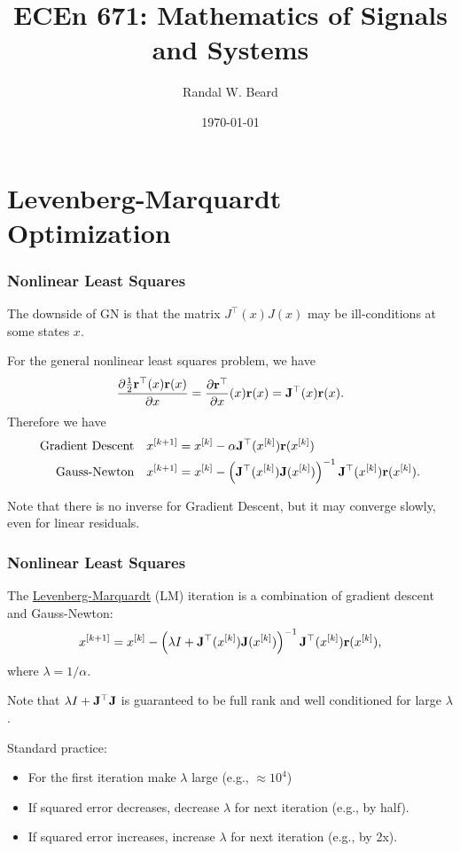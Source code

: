 \documentclass{beamer}
\title{ECEn 671: Mathematics of Signals and Systems}
\author{Randal W. Beard}
\institute{Brigham Young University}
\date{\today}
\begin{document}
\begin{frame}
	\titlepage
\end{frame}

\section{Levenberg-Marquardt Optimization}
\frame{\sectionpage}

\begin{frame}\frametitle{Nonlinear Least Squares}
	The downside of GN is that the matrix $J^\top(x) J(x)$ may be ill-conditions at some states $x$.
	
	For the general nonlinear least squares problem, we have
	\[
	\frac{\partial \frac{1}{2}\mathbf{r}^\top(x) \mathbf{r}(x)}{\partial x} = \frac{\partial \mathbf{r}^\top}{\partial x}(x) \mathbf{r}(x) = \mathbf{J}^\top(x)\mathbf{r}(x).
	\]
	Therefore we have
	\begin{align*}
		\text{Gradient Descent} &\quad 	x^{[k+1]} = x^{[k]} - \alpha \mathbf{J}^\top(x^{[k]}) \mathbf{r}(x^{[k]}) \\
		\text{Gauss-Newton} &\quad 	x^{[k+1]} = x^{[k]} - \left(\mathbf{J}^\top(x^{[k]}) \mathbf{J}(x^{[k]})\right)^{-1} \mathbf{J}^\top(x^{[k]}) \mathbf{r}(x^{[k]}).		
	\end{align*}
	
	Note that there is no inverse for Gradient Descent, but it may converge slowly, even for linear residuals.
\end{frame}

\begin{frame}\frametitle{Nonlinear Least Squares}
	The \underline{Levenberg-Marquardt} (LM) iteration is a combination of gradient descent and Gauss-Newton:
	\[
		x^{[k+1]} = x^{[k]} - \left(\lambda I + \mathbf{J}^\top(x^{[k]}) \mathbf{J}(x^{[k]})\right)^{-1} \mathbf{J}^\top(x^{[k]}) \mathbf{r}(x^{[k]}),
	\]	
	where $\lambda = 1/\alpha$.  
	
	Note that $\lambda I + \mathbf{J}^\top \mathbf{J}$ is guaranteed to be full rank and well conditioned for large $\lambda$.
	
	Standard practice:
	\begin{itemize}
		\item For the first iteration make $\lambda$ large (e.g., $\approx 10^4$)
		\item If squared error decreases, decrease $\lambda$ for next iteration (e.g., by half).
		\item If squared error increases, increase $\lambda$ for next iteration (e.g., by 2x).
	\end{itemize}
\end{frame}
\end{document}
